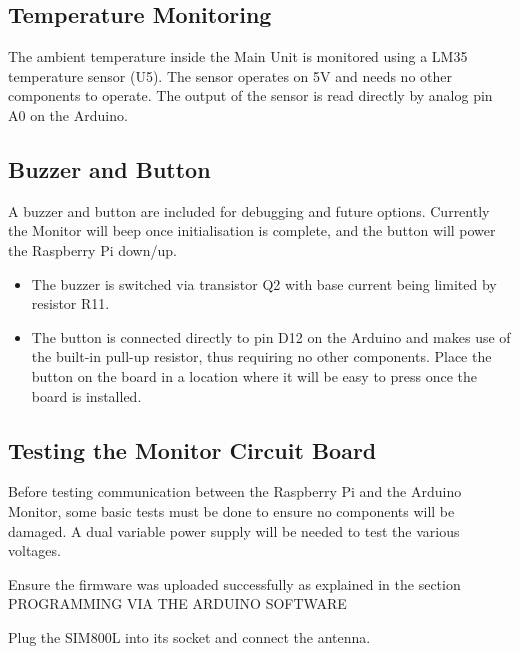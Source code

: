 \documentclass[
  letterpaper,
]{scrbook}
\begin{document}
\subsection{Temperature Monitoring}\label{temperature-monitoring}

The ambient temperature inside the Main Unit is monitored using a LM35
temperature sensor (U5). The sensor operates on 5V and needs no other
components to operate. The output of the sensor is read directly by
analog pin A0 on the Arduino.

\subsection{Buzzer and Button}\label{buzzer-and-button}

A buzzer and button are included for debugging and future options.
Currently the Monitor will beep once initialisation is complete, and the
button will power the Raspberry Pi down/up.

\begin{itemize}
\item
  The buzzer is switched via transistor Q2 with base current being
  limited by resistor R11.
\item
  The button is connected directly to pin D12 on the Arduino and makes
  use of the built-in pull-up resistor, thus requiring no other
  components. Place the button on the board in a location where it will
  be easy to press once the board is installed.
\end{itemize}

\subsection{Testing the Monitor Circuit
Board}\label{testing-the-monitor-circuit-board}

Before testing communication between the Raspberry Pi and the Arduino
Monitor, some basic tests must be done to ensure no components will be
damaged. A dual variable power supply will be needed to test the various
voltages.

Ensure the firmware was uploaded successfully as explained in the
section PROGRAMMING VIA THE ARDUINO SOFTWARE

Plug the SIM800L into its socket and connect the antenna.
\end{document}
